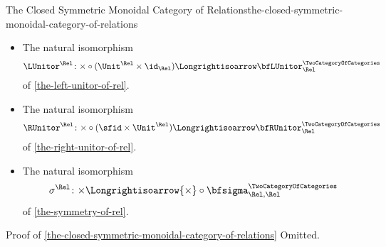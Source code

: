 \begin{proposition}{The Closed Symmetric Monoidal Category of Relations}{the-closed-symmetric-monoidal-category-of-relations}
\begin{itemize}
            of \cref{the-associator-of-rel}.
        \item{}The natural isomorphism
            \[
                \LUnitor^{\Rel}%
                \colon%
                {\times}\circ{(\Unit^{\Rel}\times\id_{\Rel})}
                \Longrightisoarrow
                \bfLUnitor^{\TwoCategoryOfCategories}_{\Rel}
            \]
            of \cref{the-left-unitor-of-rel}.
        \item{}The natural isomorphism
            \[
                \RUnitor^{\Rel}%
                \colon%
                {\times}\circ{({\sfid}\times{\Unit^{\Rel}})}%
                \Longrightisoarrow%
                \bfRUnitor^{\TwoCategoryOfCategories}_{\Rel}%
            \]
            of \cref{the-right-unitor-of-rel}.
        \item{}The natural isomorphism
            \[
                \sigma^{\Rel}
                \colon
                {\times}
                \Longrightisoarrow
                {\times}\circ{\bfsigma^{\TwoCategoryOfCategories}_{\Rel,\Rel}}
            \]
            of \cref{the-symmetry-of-rel}.
    \end{itemize}
\end{proposition}
\begin{Proof}{Proof of \cref{the-closed-symmetric-monoidal-category-of-relations}}%
    Omitted.
\end{Proof}
